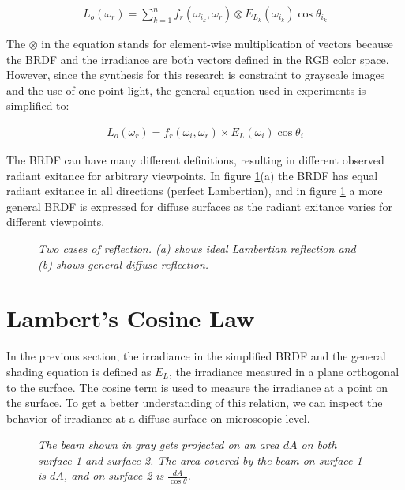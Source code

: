 		\begin{eqnarray*}
			L_o(\omega_r) = \sum_{k=1}^n f_r(\omega_{i_k}, \omega_r) \otimes E_{L_k}(\omega_{i_k})\cos\theta_{i_k}
		\end{eqnarray*}

\noindent The $\otimes$ in the equation stands for element-wise multiplication of vectors because the BRDF and the irradiance are both vectors defined in the RGB color space. However, since the synthesis for this research is constraint to grayscale images and the use of one point light, the general equation used in experiments is simplified to:

		\begin{eqnarray*}
			L_o(\omega_r) = f_r(\omega_{i}, \omega_r) \times E_{L}(\omega_{i})\cos\theta_{i}
		\end{eqnarray*}

The BRDF can have many different definitions, resulting in different observed radiant exitance for arbitrary viewpoints. In figure \ref{fig:BRDF}(a) the BRDF has equal radiant exitance in all directions (perfect Lambertian), and in figure \ref{fig:BRDF} a more general BRDF is expressed for diffuse surfaces as the radiant exitance varies for different viewpoints.

\begin{figure}[H]
	\begin{center}
	\end{center}
	\caption{{\it Two cases of reflection. (a) shows ideal Lambertian reflection and (b) shows general diffuse reflection.}}
	\label{fig:BRDF}
\end{figure}

\section{Lambert's Cosine Law}

In the previous section, the irradiance in the simplified BRDF and the general shading equation is defined as $E_L$, the irradiance measured in a plane orthogonal to the surface. The cosine term is used to measure the irradiance at a point on the surface. To get a better understanding of this relation, we can inspect the behavior of irradiance at a diffuse surface on microscopic level.

\begin{figure}[H]
	\begin{center}
	\end{center}
	\caption{{\it The beam shown in gray gets projected on an area $dA$ on both surface 1 and surface 2. The area covered by the beam on surface 1 is $dA$, and on surface 2 is $\frac{dA}{\cos\theta}$. }}
	\label{fig:BEAM}
\end{figure}

